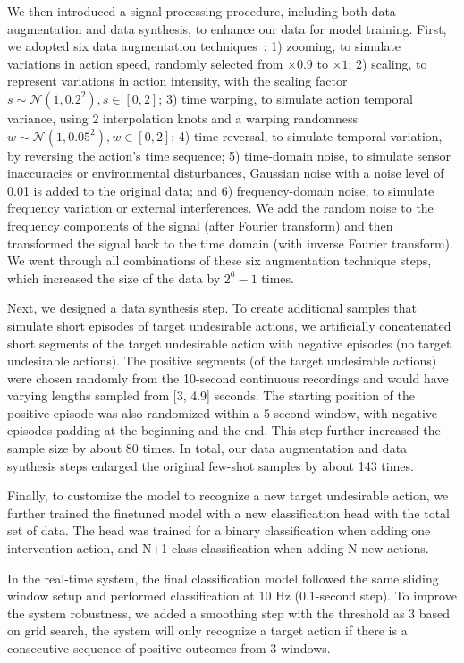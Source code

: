 We then introduced a signal processing procedure, including both data augmentation and data synthesis, to enhance our data for model training.
First, we adopted six data augmentation techniques~\cite{iglesias2023data}:
1) zooming, to simulate variations in action speed, randomly selected from $\times0.9$ to $\times1$;
2) scaling, to represent variations in action intensity, with the scaling factor $s \sim \mathcal{N}(1,0.2^2), s \in [0,2]$;
3) time warping, to simulate action temporal variance, using 2 interpolation knots and a warping randomness $w \sim \mathcal{N}(1,0.05^2), w \in [0,2]$;
4) time reversal, to simulate temporal variation, by reversing the action's time sequence;
5) time-domain noise, to simulate sensor inaccuracies or environmental disturbances, Gaussian noise with a noise level of 0.01 is added to the original data;
and 6) frequency-domain noise, to simulate frequency variation or external interferences. We add the random noise to the frequency components of the signal (after Fourier transform) and then transformed the signal back to the time domain (with inverse Fourier transform).
We went through all combinations of these six augmentation technique steps, which increased the size of the data by $2^6-1$ times.

Next, we designed a data synthesis step. To create additional samples that simulate short episodes of target undesirable actions, we artificially concatenated short segments of the target undesirable action with negative episodes (no target undesirable actions).
The positive segments (of the target undesirable actions) were chosen randomly from the 10-second continuous recordings and would have varying lengths sampled from [3, 4.9] seconds.  
The starting position of the positive episode was also randomized within a 5-second window, with negative episodes padding at the beginning and the end.
This step further increased the sample size by about 80 times.
In total, our data augmentation and data synthesis steps enlarged the original few-shot samples by about 143 times.

Finally, to customize the model to recognize a new target undesirable action, we further trained the finetuned model with a new classification head with the total set of data. The head was trained for a binary classification when adding one intervention action, and N+1-class classification when adding N new actions.

In the real-time system, the final classification model followed the same sliding window setup and performed classification at 10 Hz (0.1-second step).
To improve the system robustness, we added a smoothing step with the threshold as 3 based on grid search, \ie the system will only recognize a target action if there is a consecutive sequence of positive outcomes from 3 windows.


